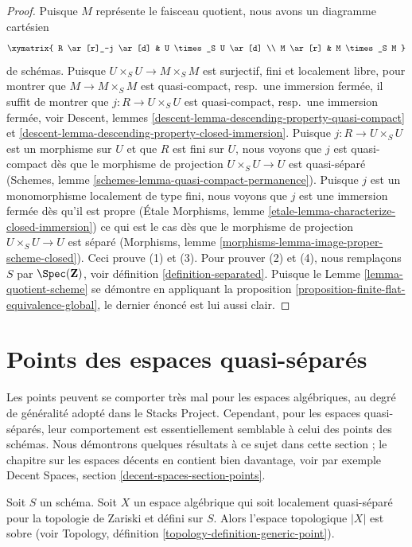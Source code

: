 \begin{proof}
Puisque $M$ représente le faisceau quotient, nous avons un diagramme cartésien
$$
\xymatrix{
R \ar[r]_-j \ar[d] & U \times_S U \ar[d] \\
M \ar[r] & M \times_S M
}
$$
de schémas. Puisque $U \times_S U \to M \times_S M$ est surjectif, fini et localement
libre, pour montrer que $M \to M \times_S M$ est quasi-compact, resp.\ une
immersion fermée, il suffit de montrer que $j : R \to U \times_S U$ est
quasi-compact, resp.\ une immersion fermée, voir
Descent, lemmes \ref{descent-lemma-descending-property-quasi-compact} et
\ref{descent-lemma-descending-property-closed-immersion}.
Puisque $j : R \to U \times_S U$ est un morphisme sur $U$ et que
$R$ est fini sur $U$, nous voyons que $j$ est quasi-compact dès que
le morphisme de projection $U \times_S U \to U$ est quasi-séparé
(Schemes, lemme \ref{schemes-lemma-quasi-compact-permanence}).
Puisque $j$ est un monomorphisme localement de type fini, nous voyons que
$j$ est une immersion fermée dès qu'il est propre
(\'Etale Morphisms, lemme \ref{etale-lemma-characterize-closed-immersion})
ce qui est le cas dès que le morphisme de projection
$U \times_S U \to U$ est séparé
(Morphisms, lemme \ref{morphisms-lemma-image-proper-scheme-closed}).
Ceci prouve (1) et (3). Pour prouver (2) et (4), nous remplaçons $S$ par
$\Spec(\mathbf{Z})$, voir définition \ref{definition-separated}.
Puisque le Lemme \ref{lemma-quotient-scheme} se démontre en appliquant la
proposition \ref{proposition-finite-flat-equivalence-global},
le dernier énoncé est lui aussi clair.
\end{proof}




\section{Points des espaces quasi-séparés}
\label{section-points-quasi-separated}

\noindent
Les points peuvent se comporter très mal pour les espaces algébriques, au degré de généralité adopté
dans le Stacks Project. Cependant, pour les espaces quasi-séparés, leur comportement
est essentiellement semblable à celui des points des schémas. Nous démontrons quelques résultats
à ce sujet dans cette section ; le chapitre sur les espaces décents en contient bien davantage,
voir par exemple
Decent Spaces, section \ref{decent-spaces-section-points}.

\begin{lemma}
\label{lemma-quasi-separated-sober}
Soit $S$ un schéma. Soit $X$ un espace algébrique qui soit localement
quasi-séparé pour la topologie de Zariski et défini sur $S$. Alors l'espace topologique $|X|$ est sobre (voir
Topology, définition \ref{topology-definition-generic-point}).
\end{lemma}

